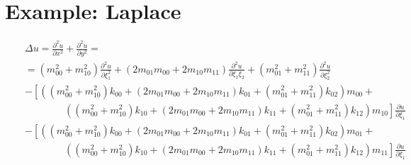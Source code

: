 \documentclass[a4paper,12pt]{article}
\begin{document}
\section{Example: Laplace}
\begin{eqnarray}
&&\displaystyle{\Delta u = \frac{\partial^2 u}{\partial x^2} + \frac{\partial^2 u}{\partial y^2} = }\nonumber\\[3mm]
&&\displaystyle{=
( m_{00}^2 + m_{10}^2)\frac{\partial^2 u}{\partial \xi_1^2} +  (2m_{01}m_{00} + 2m_{10}m_{11} )\frac{\partial^2 u}{\partial \xi_1 \xi_2} + ( m_{01}^2 + m_{11}^2)\frac{\partial^2 u}{\partial \xi_2^2} }\nonumber\\[3mm]
&&\displaystyle{ - \left[ \left(( m_{00}^2 + m_{10}^2) k_{00} + (2m_{01}m_{00} + 2m_{10}m_{11} )k_{01} + ( m_{01}^2 + m_{11}^2) k_{02} \right)m_{00} + \right.}\nonumber\\[3mm]
&&\displaystyle{\qquad\qquad\left. \left(( m_{00}^2 + m_{10}^2) k_{10} + (2m_{01}m_{00} + 2m_{10}m_{11} )k_{11} + ( m_{01}^2 + m_{11}^2) k_{12} \right)m_{10}\right] \frac{\partial u}{\partial \xi_1}}\nonumber\\[3mm]
&&\displaystyle{ - \left[ \left(( m_{00}^2 + m_{10}^2) k_{00} + (2m_{01}m_{00} + 2m_{10}m_{11} )k_{01} + ( m_{01}^2 + m_{11}^2) k_{02} \right)m_{01} +\right.}\nonumber\\[3mm]
&&\displaystyle{\qquad\qquad\left. \left(( m_{00}^2 + m_{10}^2) k_{10} + (2m_{01}m_{00} + 2m_{10}m_{11} )k_{11} + ( m_{01}^2 + m_{11}^2) k_{12} \right)m_{11}\right] \frac{\partial u}{\partial \xi_1}}\nonumber
\end{eqnarray}
\end{document}
